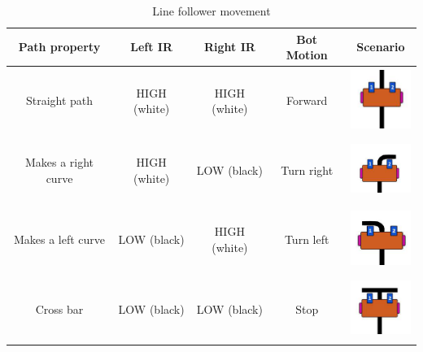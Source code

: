 \renewcommand{\arraystretch}{3.6}
\begin{table}
    \centering
    \begin{tabular}{|c|c|c|c|c|}
    \hline
        \textbf{Path property} & \textbf{Left IR} & \textbf{Right IR} & \textbf{Bot Motion} & \textbf{Scenario} \\ \hline
        Straight path & HIGH (white) & HIGH (white) & Forward & \begin{minipage}{.3\textwidth}
            \centering
            \includegraphics[width=20mm, height=20mm]{Images/IR Sensor/IR_linefollower_straight.png}
            \vspace{1mm}
        \end{minipage} \\ \hline
        Makes a right curve & HIGH (white) & LOW (black) & Turn right & \begin{minipage}{.3\textwidth}
            \centering
            \includegraphics[width=20mm, height=20mm]{Images/IR Sensor/IR_linefollower_right.png}
            \vspace{1mm}
        \end{minipage}  \\ \hline
        Makes a left curve & LOW (black) & HIGH (white) & Turn left & \begin{minipage}{.3\textwidth}
            \centering
            \includegraphics[width=20mm, height=20mm]{Images/IR Sensor/IR_linefollower_left.png}
            \vspace{1mm}
        \end{minipage}  \\ \hline
        Cross bar & LOW (black) & LOW (black) & Stop & \begin{minipage}{.3\textwidth}
            \centering
            \includegraphics[width=20mm, height=20mm]{Images/IR Sensor/IR_linefollower_stop.png}
            \vspace{1mm}
        \end{minipage}  \\ \hline
    \end{tabular}
    \vspace{9mm}
    \caption{Line follower movement}
    \label{tab:line_follower_move}
\end{table}
